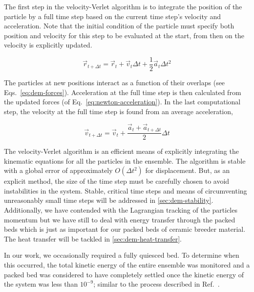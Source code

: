 The first step in the velocity-Verlet algorithm is to integrate the position of the particle by a full time step based on the current time step's velocity and acceleration. Note that the initial condition of the particle must specify both position and velocity for this step to be evaluated at the start, from then on the velocity is explicitly updated.

\begin{equation}
	\vec{r}_{t+\Delta t} = \vec{r}_t + \vec{v}_t\Delta t + \frac{1}{2}\vec{a}_t\Delta t^2
\end{equation}

The particles at new positions interact as a function of their overlaps (see Eqs.~\ref{eq:dem-forces}). Acceleration at the full time step is then calculated from the updated forces (of Eq.~\ref{eq:newton-acceleration}). In the last computational step, the velocity at the full time step is found from an average acceleration,

\begin{equation}
	\vec{v}_{t+\Delta t} = \vec{v}_t + \frac{\vec{a}_t + \vec{a}_{t+\Delta t}}{2}\Delta t
\end{equation}

The velocity-Verlet algorithm is an efficient means of explicitly integrating the kinematic equations for all the particles in the ensemble. The algorithm is stable with a global error of approximately $O(\Delta t^2)$ for displacement.\cite{Grubmuller1991} But, as an explicit method, the size of the time step must be carefully chosen to avoid instabilities in the system. Stable, critical time steps and means of circumventing unreasonably small time steps will be addressed in \cref{sec:dem-stability}. Additionally, we have contended with the Lagrangian tracking of the particles momentum but we have still to deal with energy transfer through the packed beds which is just as important for our packed beds of ceramic breeder material. The heat transfer will be tackled in \cref{sec:dem-heat-transfer}.

In our work, we occasionally required a fully quiesced bed. To determine when this occurred, the total kinetic energy of the entire ensemble was monitored and a packed bed was considered to have completely settled once the kinetic energy of the system was less than $10^{-9}$; similar to the process described in Ref.~\cite{Silbert2002}. 